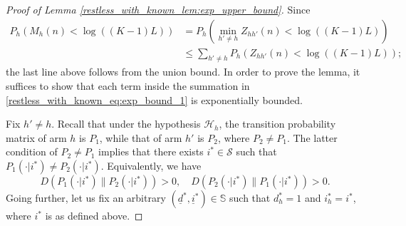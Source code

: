 \begin{proof}[Proof of Lemma \ref{restless_with_known_lem:exp_upper_bound}]
Since
\begingroup\allowdisplaybreaks\begin{align}
	P_h(M_h(n)<\log((K-1)L))
	&=P_h\left(\min\limits_{h'\neq h}Z_{hh'}(n)<\log((K-1)L)\right)\nonumber\\
	&\leq \sum\limits_{h'\neq h}P_h\left(Z_{hh'}(n)<\log((K-1)L)\right);\label{restless_with_known_eq:exp_bound_1}
\end{align}\endgroup
the last line above follows from the union bound. In order to prove the lemma, it suffices to show that each term inside the summation in \eqref{restless_with_known_eq:exp_bound_1} is exponentially bounded.  

Fix $h'\neq h$. Recall that under the hypothesis $\mathcal{H}_h$, the transition probability matrix of arm $h$ is $P_1$, while that of arm $h'$ is $P_2$, where $P_2\neq P_1$. The latter condition of $P_2\neq P_1$ implies that there exists $i^*\in\mathcal{S}$ such that $P_1(\cdot|i^*)\neq P_2(\cdot|i^*)$. Equivalently, we have $$D(P_1(\cdot|i^*)\|P_2(\cdot|i^*))>0, \quad D(P_2(\cdot|i^*)\|P_1(\cdot|i^*))>0.$$ Going further, let us fix an arbitrary $(\underline{d}^*,\underline{i}^*)\in\mathbb{S}$ such that $d_h^*=1$ and $i_h^*=i^*$, where $i^*$ is as defined above.


\end{proof}
